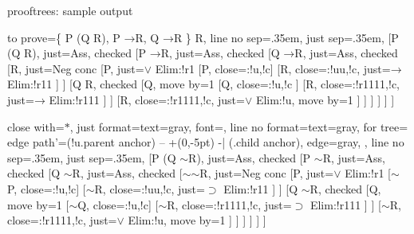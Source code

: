 \documentclass[10pt,british,a4paper,doc2]{ltxdoc}
\newcommand*\pkg[1]{\textsf{#1}}
\newcommand*{\tnot}{\ensuremath{\mathord{\sim}}}
\newcommand*{\lif}{\ensuremath{\mathbin{\rightarrow}}}
\begin{document}
\begin{coeden}[label=sample, floatplacement={!bp}, grow to left by=3em, grow to right by=3em]{\pkg{prooftrees}: sample output}
  \centering
  \begin{tableau}
    {
      to prove={\{ P \lor (Q \lor \lnot R), P \lif \lnot R, Q \lif \lnot R \} \sststile{}{} \lnot R},
      line no sep=.35em,
      just sep=.35em,
    }
    [P \lor (Q \lor \lnot R),  just=Ass, checked
      [P \lif \lnot R,  just=Ass, checked
        [Q \lif \lnot R,  just=Ass, checked
          [\lnot\lnot R, just={Neg conc}
            [P,  just={$\lor$ Elim:!r1}
              [\lnot P, close={:!u,!c}]
              [\lnot R,  close={:!uu,!c}, just={$\lif$ Elim:!r11}
              ]
            ]
            [Q \lor \lnot R, checked
              [Q, move by=1
                [\lnot Q, close={:!u,!c}
                ]
                [\lnot R,  close={:!r1111,!c}, just={$\lif$ Elim:!r111}
                ]
              ]
              [\lnot R, close={:!r1111,!c}, just={$\lor$ Elim:!u}, move by=1
              ]
            ]
          ]
        ]
      ]
    ]
  \end{tableau}\hfill
  {\renewcommand*\linenumberstyle[1]{#1)}%
  \begin{tableau}
    {
      close with={\ensuremath{\ast}},
      just format={text=gray, font=\itshape},
      line no format={text=gray},
      for tree={
        edge path'={(!u.parent anchor) -- +(0,-5pt) -| (.child anchor)},
        edge={gray},
      },
      line no sep=.35em,
      just sep=.35em,
    }
    [P \lor (Q \lor \tnot R),  just=Ass, checked
      [P \supset \tnot R,  just=Ass, checked
        [Q \supset \tnot R,  just=Ass, checked
          [\tnot\tnot R, just={Neg conc}
            [P,  just={$\lor$ Elim:!r1}
              [\tnot P, close={:!u,!c}]
              [\tnot R,  close={:!uu,!c}, just={$\supset$ Elim:!r11}
              ]
            ]
            [Q \lor \tnot R, checked
              [Q, move by=1
                [\tnot Q, close={:!u,!c}]
                [\tnot R,  close={:!r1111,!c}, just={$\supset$ Elim:!r111}
                ]
              ]
              [\tnot R,  close={:!r1111,!c}, just={$\lor$ Elim:!u}, move by=1
              ]
            ]
          ]
        ]
      ]
    ]
  \end{tableau}}


\end{coeden}
\end{document}
